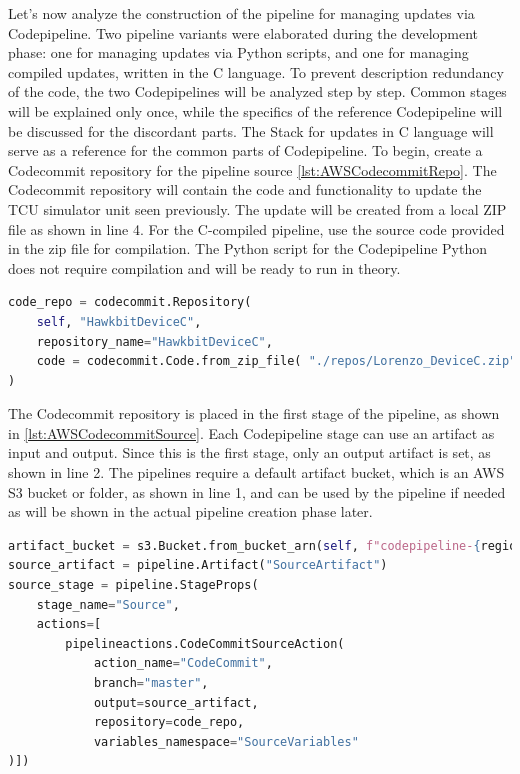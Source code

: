 Let's now analyze the construction of the pipeline for managing updates via Codepipeline. Two pipeline variants were elaborated during the development phase: one for managing updates via Python scripts, and one for managing compiled updates, written in the C language. To prevent description redundancy of the code, the two Codepipelines will be analyzed step by step. Common stages will be explained only once, while the specifics of the reference Codepipeline will be discussed for the discordant parts. The Stack for updates in C language will serve as a reference for the common parts of Codepipeline.
To begin, create a Codecommit repository for the pipeline source \ref{lst:AWSCodecommitRepo}. The Codecommit repository will contain the code and functionality to update the TCU simulator unit seen previously. The update will be created from a local ZIP file as shown in line 4. For the C-compiled pipeline, use the source code provided in the zip file for compilation. The Python script for the Codepipeline Python does not require compilation and will be ready to run in theory.
\begin{lstlisting}[language=Python, caption={CDK Code for the creation of the TCU simulator Codecommit repository}, label=lst:AWSCodecommitRepo]
code_repo = codecommit.Repository(
    self, "HawkbitDeviceC",
    repository_name="HawkbitDeviceC",
    code = codecommit.Code.from_zip_file( "./repos/Lorenzo_DeviceC.zip", "master" ) # Copies files from app directory to the repo as the initial commit
)
\end{lstlisting}

The Codecommit repository is placed in the first stage of the pipeline, as shown in \ref{lst:AWSCodecommitSource}. Each Codepipeline stage can use an artifact as input and output. Since this is the first stage, only an output artifact is set, as shown in line 2. The pipelines require a default artifact bucket, which is an AWS S3 bucket or folder, as shown in line 1, and can be used by the pipeline if needed as will be shown in the actual pipeline creation phase later.
\begin{lstlisting}[language=Python, caption={CDK Code for the Codecommit source stage set up}, label=lst:AWSCodecommitSource]
artifact_bucket = s3.Bucket.from_bucket_arn(self, f"codepipeline-{region}-****", f"arn:aws:s3:::codepipeline-{region}-****") #default codepipeline bucket
source_artifact = pipeline.Artifact("SourceArtifact")
source_stage = pipeline.StageProps(
    stage_name="Source",
    actions=[
        pipelineactions.CodeCommitSourceAction(
            action_name="CodeCommit",
            branch="master",
            output=source_artifact,
            repository=code_repo,
            variables_namespace="SourceVariables"
)])
\end{lstlisting}

